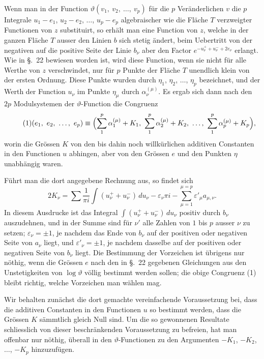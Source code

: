 \documentclass[12pt,a4paper]{article}
\begin{document}
Wenn man in der Function $\vartheta(v_1,\ v_2,\ \ldots,\ v_p)$ für die $p$ Veränderlichen $v$ die $p$ Integrale $u_1 - e_1$, $u_2 - e_2$, $\ldots$, $u_p - e_p$ algebraischer wie die Fläche $T$ verzweigter Functionen von $z$ substituirt, so erhält man eine Function von $z$, welche in der ganzen Fläche $T$ ausser den Linien $b$ sich stetig ändert, beim Uebertritt von der negativen auf die positive Seite der Linie $b_\nu$ aber den Factor $e^{-u_\nu^+ + u_\nu^- + 2e_\nu}$ erlangt. Wie in \S.~22 bewiesen worden ist, wird diese Function, wenn sie nicht für alle Werthe von $z$ verschwindet, nur für $p$ Punkte der Fläche $T$ unendlich klein von der ersten Ordnung. Diese Punkte wurden durch $\eta_1$, $\eta_2$, $\ldots$, $\eta_p$ bezeichnet, und der Werth der Function $u_\nu$ im Punkte $\eta_\mu$ durch $\alpha_\nu^{(\mu)}$. Es ergab sich dann nach den $2p$ Modulsystemen der $\vartheta$-Function die Congruenz
\begin{equation}
\tag{1} (e_1,\ e_2,\ \ldots,\ e_p) \equiv \Bigl(\sum_1^p \alpha_1^{(\mu)} + K_1,\ \sum_1^p \alpha_2^{(\mu)} + K_2,\ \ldots,\ \sum_1^p \alpha_p^{(\mu)} + K_p\Bigr), \end{equation}
worin die Grössen $K$ von den bis dahin noch willkürlichen additiven Constanten in den Functionen $u$ abhingen, aber von den Grössen $e$ und den Punkten $\eta$ unabhängig waren.

Führt man die dort angegebene Rechnung aus, so findet sich
\begin{equation}
\tag{2} 2K_\nu = \sum \frac{1}{\pi i}\int (u_\nu^+ + u_\nu^-)\,du_\nu - \varepsilon_\nu\pi i - \sum_{\mu=1}^{\mu=p} \varepsilon'_\mu a_{\mu,\nu}. \end{equation}
In diesem Ausdrucke ist das Integral $\int(u_\nu^+ + u_\nu^-)\,du_\nu$ positiv durch $b_\nu$ auszudehnen, und in der Summe sind für $\nu'$ alle Zahlen von $1$ bis $p$ ausser $\nu$ zu setzen; $\varepsilon_\nu = \pm 1$, je nachdem das Ende von $b_\nu$ auf der positiven oder negativen Seite von $a_\nu$ liegt, und $\varepsilon'_\nu = \pm 1$, je nachdem dasselbe auf der positiven oder negativen Seite von $b_\nu$ liegt. Die Bestimmung der Vorzeichen ist übrigens nur nöthig, wenn die Grössen $e$ nach den in \S.~22 gegebenen Gleichungen aus den Unstetigkeiten von $\log\vartheta$ völlig bestimmt werden sollen; die obige Congruenz (1) bleibt richtig, welche Vorzeichen man wählen mag.

Wir behalten zunächst die dort gemachte vereinfachende Voraussetzung bei, dass die additiven Constanten in den Functionen $u$ so bestimmt werden, dass die Grössen $K$ sämmtlich gleich Null sind. Um die so gewonnenen Resultate schliesslich von dieser beschränkenden Voraussetzung zu befreien, hat man offenbar nur nöthig, überall in den $\vartheta$-Functionen zu den Argumenten $-K_1$, $-K_2$, $\ldots$, $-K_p$ hinzuzufügen.
\end{document}
